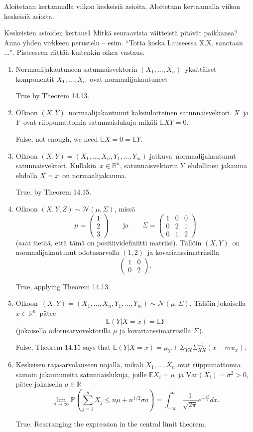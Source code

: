 \documentclass[11pt,a4paper]{amsart}
\newcommand{\R}{\mathbb{R}}
\newcommand{\E}{\mathbb{E}}
\newcommand{\1}{\mathbf{1}}
\renewcommand{\P}{\mathbb P}
\begin{document}
Aloitetaan kertaamalla viikon keskeisiä asioita.
Aloitetaan kertaamalla viikon keskeisiä asioita.
\begin{Exercises}{Keskeisten asioiden kertaus}{1}
Mitkä seuraavista väitteistä pitävät paikkansa? Anna yhden virkkeen perustelu -- esim. ``Totta koska Lauseessa X.X. sanotaan ...". Pisteeseen riittää kuitenkin oikea vastaus. 
\begin{enumerate}
\item Normaalijakautuneen satunnaisvektorin $(X_1,...,X_n)$ yksittäiset komponentit $X_1,...,X_n$ ovat normaalijakautuneet

True by Theorem 14.13.
\item Olkoon $(X,Y)$ normaalijakautunut kaksiulotteinen satunnaisvektori. $X$ ja $Y$ ovat riippumattomia satunnaislukuja mikäli $\E XY=0$.

False, not enough, we need $ \E X = 0 = \E Y$.
\item Olkoon $(X,Y)=(X_1,...,X_n,Y_1,...,Y_m)$ jatkuva normaalijakautunut satunnaisvektori. Kullakin $x\in \R^n$, satunnaisvektorin $Y$ ehdollinen jakauma ehdolla $X=x$ on normaalijakauma. 

True, by Theorem 14.15.
\item Olkoon $(X,Y,Z)\sim \mathcal N(\mu,\Sigma)$, missä 
\[
\mu=\begin{pmatrix}
1 \\ 
2\\ 
3
\end{pmatrix} \qquad \text{ja} \qquad \Sigma=\begin{pmatrix}
1 & 0 & 0\\
0 & 2 & 1\\
0 & 1 & 2
\end{pmatrix}
\]
(saat tietää, että tämä on positiividefiniitti matriisi). Tällöin $(X,Y)$ on normaalijakautunut odotusarvolla $(1,2)$ ja kovarianssimatriisilla
\[
\begin{pmatrix}
1 & 0\\
0 & 2
\end{pmatrix}.
\]

True, applying Theorem 14.13.
\item Olkoon $(X,Y)=(X_1,...,X_n,Y_1,...,Y_m)\sim \mathcal N(\mu,\Sigma)$. Tällöin jokaisella $x\in \R^n$ pätee 
\[
\E (Y|X=x)=\E Y
\]
(jokaisella odotusarvovektorilla $\mu$ ja kovarianssimatriisilla $\Sigma$).

False, Theorem 14.15 says that $ \E( Y| X=x) = \mu_{Y} + \Sigma_{YX} \Sigma_{XX}^{-1}(x-mu_{x})   $.
\item Keskeisen raja-arvolauseen nojalla, mikäli $X_1,...,X_n$ ovat riippumattomia samoin jakautuneita satunnaislukuja, joille $\E X_i=\mu$ ja $\mathrm{Var}(X_i)=\sigma^2>0$, pätee jokaisella $a\in \R$
\[
\lim_{n\to\infty}\P\left(\sum_{j=1}^nX_j \leq n\mu+ n^{1/2}\sigma a\right)=\int_{-\infty}^a \frac{1}{\sqrt{2\pi}}e^{-\frac{x^2}{2}}dx.
\]

True. Rearranging the expression in the central limit theorem.
\end{enumerate}
\end{Exercises}
\end{document}
